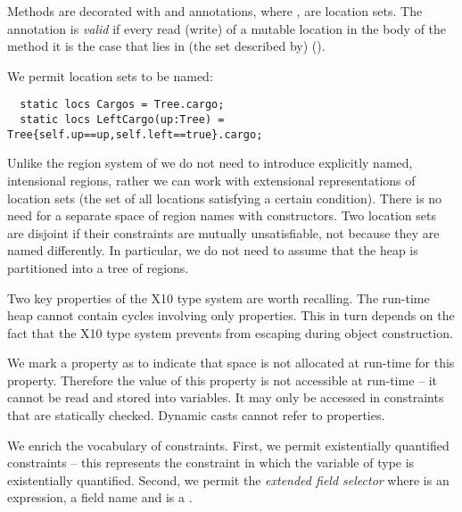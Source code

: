 Methods are decorated with  and 
annotations, where , are location sets. The annotation
is {\em valid} if every read (write) of a mutable location  in the
body of the method it is the case that  lies in (the set
described by)  ().

We permit location sets to be named:
\begin{lstlisting}
  static locs Cargos = Tree.cargo;
  static locs LeftCargo(up:Tree) = Tree{self.up==up,self.left==true}.cargo;
\end{lstlisting}

Unlike the region system of \cite{DPJ} we do not need to introduce
explicitly named, intensional regions, rather we can work with
extensional representations of location sets (the set of all locations
satisfying a certain condition).  There is no need for a separate
space of region names with constructors. Two location sets are
disjoint if their constraints are mutually unsatisfiable, not because
they are named differently. In particular, we do not need to assume
that the heap is partitioned into a tree of regions.

Two key properties of the X10 type system are worth recalling. The run-time
heap cannot contain cycles involving only properties. This in turn
depends on the fact that the X10 type system prevents  from
escaping during object construction\cite{X10-object-initialization}.

We mark a property as  to indicate that space is not
allocated at run-time for this property. Therefore the value of this
property is not accessible at run-time -- it cannot be read and stored
into variables. It may only be accessed in constraints that are
statically checked. Dynamic casts cannot refer to 
properties.

We enrich the vocabulary of constraints. First, we permit
existentially quantified constraints  -- this represents
the constraint  in which the variable  of type
 is existentially quantified. Second, we permit the {\em
  extended field selector}  where  is an
expression,  a field name and  is a .



